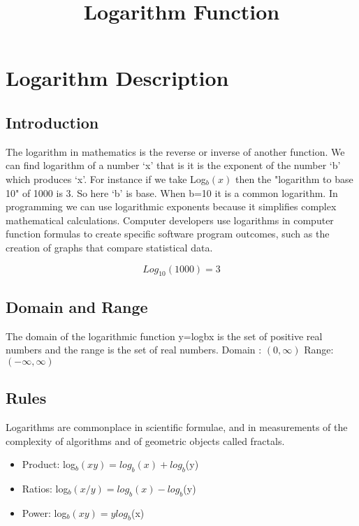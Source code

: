 \documentclass{article}
\title{\textbf {Logarithm Function}}
\begin{document}
\maketitle

\section{Logarithm Description}
\subsection{Introduction}

The logarithm in mathematics is the reverse or inverse of another function. We can find logarithm of a number ‘x’ that is it is the exponent of the number ‘b’ which produces ‘x’. For instance if we take Log$_{b}(x)$ then the "logarithm to base 10" of 1000 is 3. So here ‘b’ is base. When b=10 it is a common logarithm. In programming we can use logarithmic exponents because it simplifies complex mathematical calculations. Computer developers use logarithms in computer function formulas to create specific software program outcomes, such as the creation of graphs that compare statistical data.


\begin{equation}
Log_{10}(1000)=3
\end{equation}
\subsection{Domain and Range}
The domain of the logarithmic function y=logbx is the set of positive real numbers and the range is the set of real numbers.
Domain : $(0,\infty)$
Range:  $(-\infty,\infty)$
\subsection{Rules}
Logarithms are commonplace in scientific formulae, and in measurements of the complexity of algorithms and of geometric objects called fractals. 
\begin{itemize}
\item	Product:			log$_{b}(xy)  = log_{b}(x)+ log_{b}$(y)
\item	Ratios:			log$_{b}(x/y) = log_{b}(x)- log_{b}$(y)
\item	Power:			log$_{b}(xy)   = y log_{b}$(x)
\end{itemize}
\end{document}
